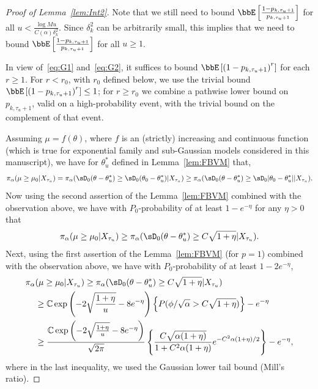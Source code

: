 \documentclass[11pt]{article}
\begin{document}
\begin{proof}[Proof of Lemma~\ref{lem:Int2}]
Note that we still need to bound $\bbE \left[   \frac{1-p_{k,\tau_{u}+1}}{p_{k,\tau_{u}+1}}     \right]$ for all $u < \frac{\log M u}{C(\alpha)\delta_k^2}$. Since $\delta_k^2$ can be arbitrarily small, this implies that we need to bound $\bbE \left[   \frac{1-p_{k,\tau_{u}+1}}{p_{k,\tau_{u}+1}}     \right]$ for all $u \geq 1$.

In view of~\eqref{eq:G1} and~\eqref{eq:G2}, it suffices to bound $\bbE\left[\left(1-p_{k,\tau_u+1}\right)^{r}\right]$ for each $r \geq 1$. For $r < r_0$, with $r_0$ defined below, we use the trivial bound $\bbE\left[\left(1-p_{k,\tau_u+1}\right)^{r}\right] \leq 1$; for $r \geq r_0$ we combine a pathwise lower bound on $p_{k,\tau_u+1}$, valid on a high-probability event, with the trivial bound on the complement of that event.

Assuming $\mu=f(\theta)$, where $f$ is an (strictly) increasing and continuous function (which is true for exponential family and sub-Gaussian models considered in this manuscript), we have for $\theta_{u}^*$ defined in Lemma~\ref{lem:FBVM} that,
\begin{align}
    \pi_{\alpha}(\mu\geq \mu_0|X_{\tau_{u}}) = \pi_{\alpha}(\sD_0(\theta-\theta_{u}^*) \geq \sD_0 (\theta_0-\theta_{u}^*)|X_{\tau_{u}}) \geq \pi_{\alpha}(\sD_0(\theta-\theta_{u}^*) \geq \sD_0 |\theta_0-\theta_{u}^*||X_{\tau_{u}}).
\end{align}  
Now using the second assertion of the Lemma~\ref{lem:FBVM} combined with the observation above, we have with $P_0$-probability of at least $1-e^{-\eta}$ for any $\eta>0$ that 
\begin{align}
    \pi_{\alpha}(\mu\geq \mu_0|X_{\tau_{u}}) \geq \pi_{\alpha}(\sD_0(\theta-\theta_{u}^*) \geq C\sqrt{1+\eta} |X_{\tau_{u}}) .
\end{align}
Next, using the first assertion of the Lemma~\ref{lem:FBVM} (for $p=1$) combined with the observation above, we have with $P_0$-probability of at least $1-2 e^{-\eta}$, 
\begin{align}
\nonumber
    \pi_{\alpha}&(\mu\geq \mu_0|X_{\tau_{u}}) 
    \geq \pi_{\alpha}(\sD_0(\theta-\theta_{u}^*) \geq C\sqrt{1+\eta} |X_{\tau_{u}})  \\
    \nonumber
    &
    \geq \mathbb{C}\exp\left(-2\sqrt{\frac{1+\eta}{u}} - 8e^{-\eta}\right) \left\{P(\phi/\sqrt{\alpha} > C\sqrt{1+\eta} ) \right\}-e^{-\eta}
    \\
    &\geq %
     \frac{\mathbb{C}\exp\left(-2\sqrt{\frac{1+\eta}{u}} - 8e^{-\eta}\right) }{\sqrt{2\pi}}\left\{ \frac{C\sqrt{\alpha (1+\eta)}}{1+C^2{\alpha (1+\eta)}}e^{-C^2{\alpha(1+ \eta)}/2}  \right\}-e^{-\eta}%
   ,
\end{align}
where in the last inequality, we used the Gaussian lower tail bound (Mill's ratio).


\end{proof}
\end{document}
